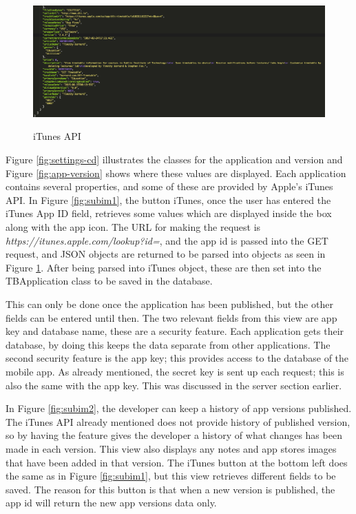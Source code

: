 \begin{figure}[!h]
    \caption{iTunes API}
    \centering
    \includegraphics[width=150mm]{images/itunes-api}
    \label{fig:itunes-API}
\end{figure} 

Figure \ref{fig:settings-cd} illustrates the classes for the application and version and Figure \ref{fig:app-version} shows where these values are displayed. Each application contains several properties, and some of these are provided by Apple’s iTunes API. In Figure \ref{fig:subim1}, the button iTunes, once the user has entered the iTunes App ID field, retrieves some values which are displayed inside the box along with the app icon. The URL for making the request is \textit{https://itunes.apple.com/lookup?id=}, and the app id is passed into the GET request, and JSON objects are returned to be parsed into objects as seen in Figure \ref{fig:itunes-API}. After being parsed into iTunes object, these are then set into the TBApplication class to be saved in the database.

This can only be done once the application has been published, but the other fields can be entered until then. The two relevant fields from this view are app key and database name, these are a security feature. Each application gets their database, by doing this keeps the data separate from other applications. The second security feature is the app key; this provides access to the database of the mobile app. As already mentioned, the secret key is sent up each request; this is also the same with the app key. This was discussed in the server section earlier.

In Figure \ref{fig:subim2}, the developer can keep a history of app versions published. The iTunes API already mentioned does not provide history of published version, so by having the feature gives the developer a history of what changes has been made in each version. This view also displays any notes and app stores images that have been added in that version. The iTunes button at the bottom left does the same as in Figure \ref{fig:subim1}, but this view retrieves different fields to be saved. The reason for this button is that when a new version is published, the app id will return the new app versions data only.

